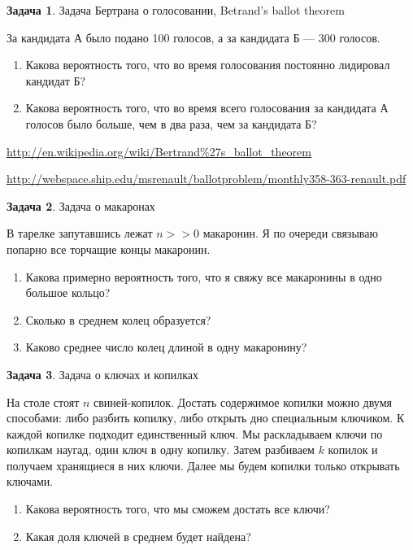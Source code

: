 \documentclass[nobib]{tufte-handout}
\theoremstyle{definition}
\newtheorem{problem}{Задача}
\begin{document}
\begin{problem}
Задача Бертрана о голосовании, Betrand's ballot theorem

За кандидата А было подано 100 голосов, а за кандидата Б — 300 голосов.
\begin{enumerate}
\item Какова вероятность того, что во время голосования постоянно лидировал кандидат Б?
\item Какова вероятность того, что во время всего голосования за кандидата А  голосов было больше, чем в два раза, чем за кандидата Б?
\end{enumerate}

\url{http://en.wikipedia.org/wiki/Bertrand%27s_ballot_theorem}

\url{http://webspace.ship.edu/msrenault/ballotproblem/monthly358-363-renault.pdf}


\end{problem}


\begin{problem}
Задача о макаронах

В тарелке запутавшись лежат $n>>0$ макаронин. Я по очереди связываю попарно все торчащие концы макаронин.

\begin{enumerate}
\item Какова примерно вероятность того, что я свяжу все макаронины в одно большое кольцо?
\item Сколько в среднем колец образуется?
\item Каково среднее число колец длиной в одну макаронину?
\end{enumerate}

\end{problem}


\begin{problem}
Задача о ключах и копилках

На столе стоят $n$ свиней-копилок. Достать содержимое копилки можно двумя
способами: либо разбить копилку, либо открыть дно специальным
ключиком. К каждой копилке подходит единственный ключ. Мы раскладываем ключи по
копилкам наугад, один ключ в одну копилку. Затем разбиваем $k$ копилок и получаем хранящиеся в них ключи. Далее мы будем копилки только открывать ключами.
\begin{enumerate}
\item Какова вероятность того, что мы сможем достать все ключи?
\item Какая доля ключей в среднем будет найдена?
\end{enumerate}


\end{problem}
\end{document}
